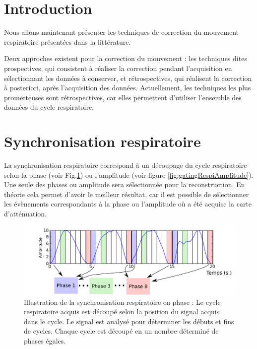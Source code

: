 \label{lab:corrMvt}

\section{Introduction}

Nous allons maintenant présenter les techniques de correction du mouvement respiratoire présentées dans la littérature. 

Deux approches existent pour la correction du mouvement : les techniques dites prospectives, qui consistent à réaliser la correction pendant l'acquisition en sélectionnant les données à conserver, et rétrospectives, qui réalisent la correction à posteriori, après l'acquisition des données. Actuellement, les techniques les plus prometteuses sont rétrospectives, car elles permettent d'utiliser l'ensemble des données du cycle respiratoire.

\section{Synchronisation respiratoire}

La synchronisation respiratoire correspond à un découpage du cycle respiratoire selon la phase (voir Fig.\ref{fig:gatingRespi}) ou l'amplitude (voir figure \ref{fig:gatingRespiAmplitude}). Une seule des phases ou amplitude sera sélectionnée pour la reconstruction. En théorie cela permet d'avoir le meilleur résultat, car il est possible de sélectionner les évènements correspondants à la phase ou l'amplitude où a été acquise la carte d'atténuation.


\begin{figure}[h!]
	\begin{center}
		\includegraphics[width=12cm]{images/ET-IM}
	\end{center}
	\caption{Illustration de la synchronisation respiratoire en phase : Le cycle respiratoire acquis est découpé selon la position du signal acquis dans le cycle. Le signal est analysé pour déterminer les débuts et fins de cycles. Chaque cycle est découpé en un nombre déterminé de phases égales.} 
	\label{fig:gatingRespi}
\end{figure}


